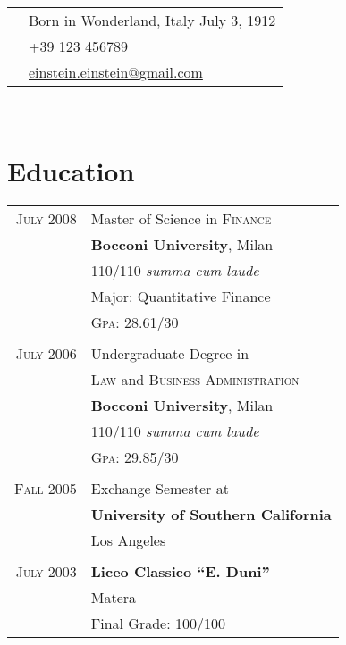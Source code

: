 \documentclass[10pt]{article}
\begin{document}
{\begin{minipage}[t]{0.5\textwidth}
\end{minipage} %
\hfill
\begin{minipage}[t]{0.44\textwidth} %
	
	\vspace{0pt} %
	
\colorbox{shade}{\textcolor{text1}{
	\begin{tabular}{c|p{7cm}}
								& Born in Wonderland, Italy July 3, 1912 \\
		\raisebox{-3pt}{\Phone}  		&+39 123 456789\\
		\raisebox{-3pt}{\Envelope} 	&\href{mailto:albert.einstein@gmail.com}
								{einstein.einstein@gmail.com}
	\end{tabular}
	}
}\\[10pt]

\section{Education}

\begin{tabular}{rl}
 	
	\textsc{July} 2008 & Master of Science in \textsc{Finance}\\
	 & \textbf{Bocconi University}, Milan\\
	 & 110/110 \small\emph{summa cum laude}\\
	 & Major: Quantitative Finance\\
	 &\normalsize \textsc{Gpa}: 28.61/30\\
	 &\\
	\textsc{July} 2006 & Undergraduate Degree in\\
	 & \textsc{Law} and \textsc{Business Administration}\\
	 & \textbf{Bocconi University}, Milan\\
	 &110/110 \small\emph{summa cum laude}\\
	 &\normalsize \textsc{Gpa}: 29.85/30\\
	 &\\
	\textsc{Fall} 2005& Exchange Semester at \\
	& \textbf{University of Southern California} \\
	&Los Angeles\\
	&\\
	\textsc{July} 2003& \textbf{Liceo Classico ``E. Duni''}\\
	& Matera\\
	& Final Grade: 100/100


\end{tabular}
\end{minipage}}
\end{document}
